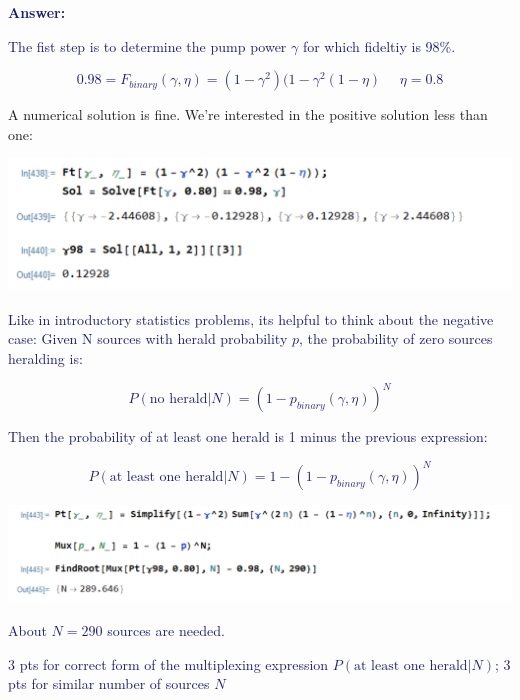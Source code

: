 \documentclass[11pt]{caltech_thesis} %
\begin{document}
\begin{enumerate}
  \textcolor{midnightblue}{ \textbf{Answer:} }

  \textcolor{midnightblue}{The fist step is to determine the pump power
  \(\gamma\) for which fideltiy is 98\%. }

  \textcolor{midnightblue}{

  \[0.98 = F_{binary}(\gamma, \eta) = (1 - \gamma^2)(1 - \gamma^2(1 - \eta)\,\,\,\,\,\,\,\, \eta = 0.8\]

  }

  A numerical solution is fine. We're interested in the positive
  solution less than one:

  \textcolor{midnightblue}{\includegraphics{chapter_05/figs_05/Ftsolve.PNG}}

  \textcolor{midnightblue}{Like in introductory statistics problems, its
  helpful to think about the negative case: Given N sources with herald
  probability \(p\), the probability of zero sources heralding is:}

  \textcolor{midnightblue}{

  \[P(\text{no herald}|N) = (1 - p_{binary}\left(\gamma, \eta\right))^N\]

  }

  \textcolor{midnightblue}{Then the probability of at least one herald
  is 1 minus the previous expression:}

  \textcolor{midnightblue}{

  \[P(\text{at least one herald}|N) = 1 - (1 - p_{binary}\left(\gamma, \eta\right))^N\]

  }

  \textcolor{midnightblue}{\includegraphics{chapter_05/figs_05/mux_binary.PNG}}

  \textcolor{midnightblue}{About \(\boxed{N = 290}\) sources are
  needed.}

  \textcolor{midnightblue}{3 pts for correct form of the multiplexing
  expression \(P(\text{at least one herald}|N)\); 3 pts for similar
  number of sources \(N\)}
\end{enumerate}
\end{document}
